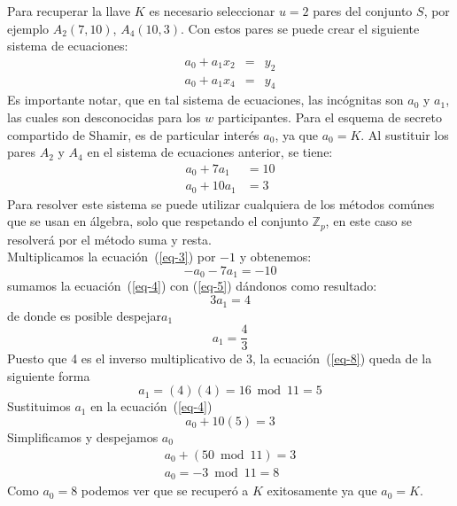 \begin{example}
Para recuperar la llave $K$ es necesario seleccionar $u=2$ pares del conjunto $S$, por ejemplo
$A_2(7,10)$, $A_4(10,3)$. Con estos pares se puede crear el siguiente  sistema de ecuaciones:
$$\begin{array}{lcl}
 a_0+a_1x_2&=&y_2 \\
 a_0+a_1x_4&=&y_4 
 \end{array}$$
 Es importante notar, que en tal sistema de ecuaciones, las inc\'ognitas son $a_0$ y $a_1$, las cuales
 son desconocidas para los $w$ participantes.  Para el esquema de secreto compartido de
 Shamir, es de particular inter\'es $a_0$, ya que  $a_0=K$.
Al sustituir los pares $A_2$ y $A_4$ en el sistema de ecuaciones anterior, se tiene:
\begin{align}
a_0+7a_1&=10 \label{eq-3}\\
a_0+10a_1&=3 \label{eq-4}
\end{align}
Para resolver este sistema se puede utilizar cualquiera de los métodos com\'unes que se usan en álgebra, solo que respetando el conjunto $\mathbb{Z}_p$, en este caso se resolverá por el método suma y resta.\\
Multiplicamos la ecuación~(\ref{eq-3}) por $-1$ y obtenemos:
\begin{equation}
 -a_0-7a_1=-10 \label{eq-5}
\end{equation}
sumamos la ecuación~(\ref{eq-4}) con (\ref{eq-5})  d\'andonos como resultado:
\begin{equation} \nonumber
 3a_1=4
\end{equation}
de donde es posible despejar$a_1$
\begin{equation}
 a_1=\frac{4}{3} \label{eq-8}
\end{equation}
Puesto que 4 es el inverso multiplicativo de 3,  la ecuación~(\ref{eq-8}) queda de la siguiente forma
\begin{equation} \nonumber
 a_1=(4)(4)=16 \bmod 11 =5
\end{equation}
Sustituimos $a_1$ en la ecuación~(\ref{eq-4}) 
\begin{equation} \nonumber
 a_0+10(5)=3
\end{equation}
Simplificamos y despejamos $a_0$
\begin{align*}
 a_0+(50 \bmod 11)=3 \\
  a_0=-3 \bmod11=8
\end{align*}
Como $a_0=8$ podemos ver que se recuper\'o a $K$ exitosamente ya que  $a_0=K$.
\end{example}


